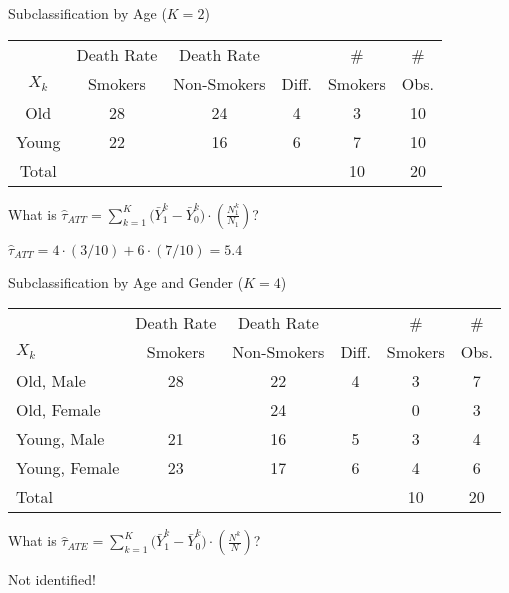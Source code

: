 \documentclass{beamer}
\numberwithin{equation}{section}
\begin{document}
\begin{frame}{Subclassification by Age ($K = 2$)}

\begin{tabular}{c|c|c|c|c|c}
           & Death Rate & Death Rate &            &          \# &         \#  \\
       $X_k$ &    Smokers & Non-Smokers &      Diff. &    Smokers &       Obs. \\
       \hline
       Old &         28 &         24 &         4 &          3 &         10 \\
       \hline
     Young &         22 &         16 &         6 &          7 &         10 \\
     \hline
     Total &            &            &            &         10 &         20 \\
\end{tabular}

What is
$\widehat{\tau}_{ATT}= \sum_{k=1}^K \big( \bar{Y}_1^k - \bar{Y}_0^k \big)\cdot \left( \frac{N_1^k}{N_1} \right)$?
\pause

$\widehat{\tau}_{ATT}=4\cdot(3/10)+6\cdot(7/10)=5.4$

\end{frame}

\begin{frame}{Subclassification by Age and Gender ($K = 4$)}

\begin{tabular}{l|c|c|c|c|c}
           & Death Rate & Death Rate &            &         \# &         \#  \\
       $X_k$ &    Smokers & Non-Smokers &      Diff. &    Smokers &       Obs. \\
       \hline
 Old, Male &         28 &         22 &          4 &          3 &          7 \\
 \hline
Old, Female &            &         24 &            &          0 &          3 \\
\hline
Young, Male &         21 &         16 &          5 &          3 &          4 \\
\hline
Young, Female &         23 &         17 &          6 &          4 &          6 \\
\hline
     Total &            &            &            &         10 &         20 \\
\end{tabular}

What is
$\widehat{\tau}_{ATE}= \sum_{k=1}^K \big( \bar{Y}_1^k - \bar{Y}_0^k \big)\cdot \left( \frac{N^k}{N} \right)$?
\pause

\alert{Not identified!}

\end{frame}
\end{document}
